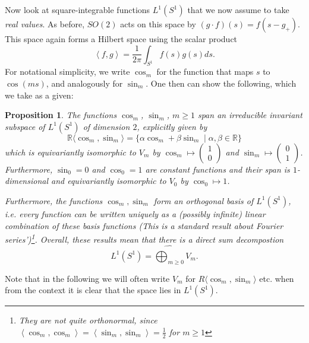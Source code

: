 \documentclass[12pt, a4paper]{article}
\theoremstyle{plain}
\newtheorem{pro}{Proposition}[section]
\theoremstyle{definition}
\theoremstyle{remark}
\newcommand{\R}{\mathds{R}}
\begin{document}
Now look at square-integrable functions $L^1(S^1)$ that we now assume to take \emph{real values}. As before, $SO(2)$ acts on this space by $(g \cdot f)(s) = f(s - g_{+})$. This space again forms a Hilbert space using the scalar product
\begin{equation*}
\left\langle f, g\right\rangle = \frac{1}{2 \pi} \int_{S^1} f(s) g(s) ds.
\end{equation*}
For notational simplicity, we write $\cos_m$ for the function that maps $s$ to $\cos(ms)$, and analogously for $\sin_m$. One then can show the following, which we take as a given:

\begin{pro}\label{description_L_1}
The functions $\cos_m$, $\sin_m$, $m \geq 1$ span an irreducible invariant subspace of $L^1(S^1)$ of dimension $2$, explicitly given by
\begin{equation*}
\R\langle \cos_m, \sin_m \rangle = \{\alpha \cos_m + \beta \sin_m \mid \alpha, \beta \in \R \}
\end{equation*}
which is equivariantly isomorphic to $V_m$ by $\cos_m \mapsto \begin{pmatrix} 1 \\ 0\end{pmatrix}$ and $\sin_m \mapsto \begin{pmatrix} 0 \\ 1 \end{pmatrix}$. Furthermore, $\sin_0 = 0$ and $\cos_0 = 1$ are constant functions and their span is $1$-dimensional and equivariantly isomorphic to $V_0$ by $\cos_0 \mapsto 1$. 

Furthermore, the functions $\cos_m, \sin_m$ form an orthogonal basis of $L^1(S^1)$, i.e. every function can be written uniquely as a (possibly infinite) linear combination of these basis functions (This is a standard result about Fourier series')\footnote{They are \emph{not quite} orthonormal, since $\left\langle \cos_m, \cos_m \right\rangle = \left\langle \sin_m, \sin_m\right\rangle = \frac{1}{2}$ for $m \geq 1$}. Overall, these results mean that there is a direct sum decompostion
\begin{equation*}
L^1(S^1) = \widehat{\bigoplus_{m \geq 0}} V_m.
\end{equation*}
\end{pro}

Note that in the following we will often write $V_m$ for $R \langle \cos_m, \sin_m \rangle$ etc. when from the context it is clear that the space lies in $L^1(S^1)$.
\end{document}
